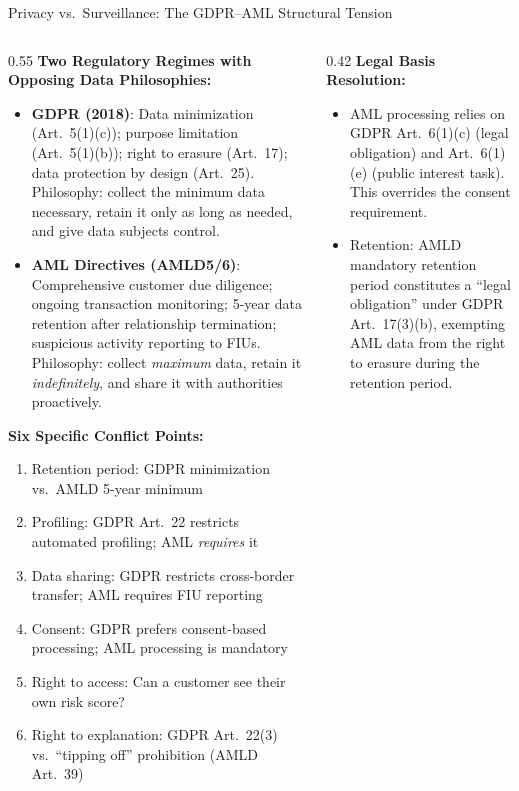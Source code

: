 \begin{frame}{Privacy vs.\ Surveillance: The GDPR--AML Structural Tension}
  \begin{columns}[T]
    \begin{column}{0.55\textwidth}
      \textbf{Two Regulatory Regimes with Opposing Data Philosophies:}
      \begin{itemize}
        \item \textbf{GDPR (2018)}: Data minimization (Art.\ 5(1)(c)); purpose limitation (Art.\ 5(1)(b)); right to erasure (Art.\ 17); data protection by design (Art.\ 25). Philosophy: collect the minimum data necessary, retain it only as long as needed, and give data subjects control.
        \item \textbf{AML Directives (AMLD5/6)}: Comprehensive customer due diligence; ongoing transaction monitoring; 5-year data retention after relationship termination; suspicious activity reporting to FIUs. Philosophy: collect \emph{maximum} data, retain it \emph{indefinitely}, and share it with authorities proactively.
      \end{itemize}
      \vspace{0.3em}
      \textbf{Six Specific Conflict Points:}
      \begin{enumerate}\small
        \item Retention period: GDPR minimization vs.\ AMLD 5-year minimum
        \item Profiling: GDPR Art.\ 22 restricts automated profiling; AML \emph{requires} it
        \item Data sharing: GDPR restricts cross-border transfer; AML requires FIU reporting
        \item Consent: GDPR prefers consent-based processing; AML processing is mandatory
        \item Right to access: Can a customer see their own risk score?
        \item Right to explanation: GDPR Art.\ 22(3) vs.\ ``tipping off'' prohibition (AMLD Art.\ 39)
      \end{enumerate}
    \end{column}
    \begin{column}{0.42\textwidth}
      \textbf{Legal Basis Resolution:}
      \begin{itemize}
        \item AML processing relies on GDPR Art.\ 6(1)(c) (legal obligation) and Art.\ 6(1)(e) (public interest task). This overrides the consent requirement.
        \item Retention: AMLD mandatory retention period constitutes a ``legal obligation'' under GDPR Art.\ 17(3)(b), exempting AML data from the right to erasure during the retention period.

\end{itemize}
\end{column}
\end{columns}
\end{frame}
